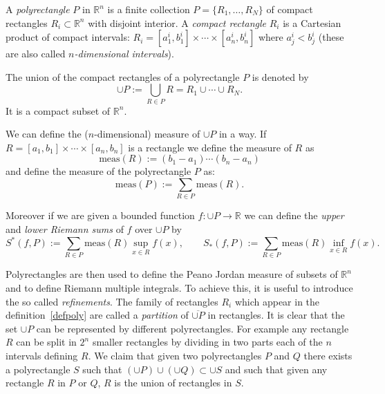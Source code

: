 \documentclass[12pt]{article}
\newcommand{\R}{\mathbb R}
\begin{document}
A \emph{polyrectangle} $P$ in $\R^n$ is a finite collection $P=\{R_1,\ldots,R_N\}$ of  compact rectangles $R_i\subset \R^n$ with disjoint interior. 
A \emph{compact rectangle} $R_i$ is a Cartesian product of compact intervals: $R_i=[a_1^i,b_1^i]\times \cdots \times [a_n^i,b_n^i]$ where $a_j^i<b_j^i$ (these are also called \emph{$n$-dimensional intervals}). 

The union of the compact rectangles of a polyrectangle $P$ is denoted by
\[
  \cup P := \bigcup_{R\in P} R = R_1 \cup \cdots \cup R_N.
\]
It is a compact subset of $\R^n$.

We can define the ($n$-dimensional) measure of $\cup P$ in a  way.
If $R=[a_1,b_1]\times \cdots \times [a_n,b_n]$ is a rectangle we define the measure of $R$ as
\[
   \mathrm{meas}(R) := (b_1-a_1)\cdots (b_n-a_n)
\]
and define the measure of the polyrectangle $P$ as:
\[
  \mathrm{meas}(P) := \sum_{R\in P} \mathrm{meas}(R).
\]

Moreover if we are given a bounded function $f\colon \cup P\to\mathbb R$ we can define the \emph{upper} and \emph{lower Riemann sums} of $f$ over $\cup P$ by
\[
   S^*(f,P) := \sum_{R\in P} \mathrm{meas}(R)\sup_{x\in R} f(x),\qquad
   S_*(f,P) := \sum_{R\in P} \mathrm{meas}(R)\inf_{x\in R} f(x).
\]

Polyrectangles are then used to define the Peano Jordan measure of subsets of $\mathbb R^n$ and to define Riemann multiple integrals. 
To achieve this, it is useful to introduce the so called \emph{refinements}. The family of rectangles $R_i$ which appear in the definition~\ref{defpoly} are called a \emph{partition} of $\overline{\cup P}$ in rectangles.
It is clear that the set $\cup P$ can be represented by different polyrectangles. For example any rectangle $R$ can be split in $2^n$ smaller rectangles by dividing in two parts each of the $n$ intervals defining $R$. 
We claim that given two polyrectangles $P$ and $Q$ there exists a polyrectangle $S$ such that $(\cup P)\cup (\cup Q) \subset \cup S$ and such that given any rectangle $R$ in $P$ or $Q$, $R$ is the union of rectangles in $S$.
\end{document}
